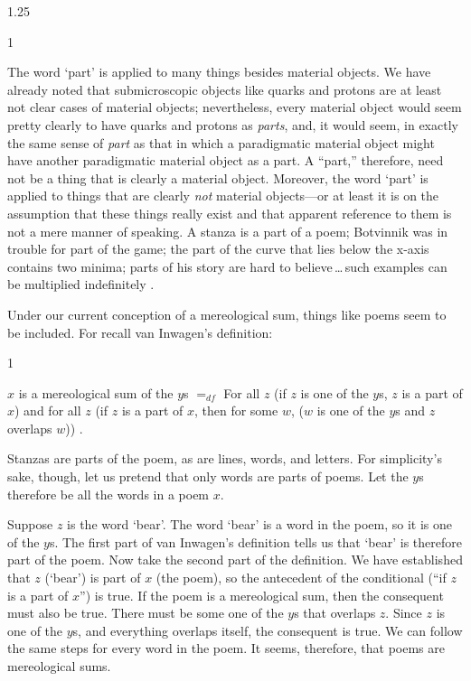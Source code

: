 \documentclass[12pt,twoside]{reedfancy}
\newenvironment{squote}{%
	\begin{spacing}{1}
	\begin{list}{}{%
	\setlength{\labelwidth}{0pt}%
	\rightmargin\leftmargin%
	}
	\item\relax
	}{%
	\end{list}%
	\end{spacing}
	}
\begin{document}
\begin{spacing}{1.25}
\begin{squote}
The word `part' is applied to many things besides material objects.
We have already noted that submicroscopic objects like quarks and
protons are at least not clear cases of material objects;
nevertheless, every material object would seem pretty clearly to have
quarks and protons as \emph{parts}, and, it would seem, in exactly the
same sense of \emph{part} as that in which a paradigmatic material
object might have another paradigmatic material object as a part.  A
``part,'' therefore, need not be a thing that is clearly a material
object.  Moreover, the word `part' is applied to things that are
clearly \emph{not} material objects---or at least it is on the
assumption that these things really exist and that apparent reference
to them is not a mere manner of speaking.  A stanza is a part of a
poem; Botvinnik was in trouble for part of the game; the part of the
curve that lies below the x-axis contains two minima; parts of his
story are hard to believe\,\ldots\,such examples can be multiplied
indefinitely \citeyearpar[18--19]{inwagen1995}.
\end{squote}

Under our current conception of a mereological sum, things like poems
seem to be included.  For recall van Inwagen's definition:

\begin{squote}
$x$ is a mereological sum of the $y$s $=_{df}$ For all $z$ (if $z$ is
  one of the $y$s, $z$ is a part of $x$) and for all $z$ (if $z$ is a
  part of $x$, then for some $w$, ($w$ is one of the $y$s and $z$
  overlaps $w$)) \citeyearpar[618--619]{inwagen2006}.
\end{squote}

Stanzas are parts of the poem, as are lines, words, and letters.  For
simplicity's sake, though, let us pretend that only words are parts of
poems.  Let the $y$s therefore be all the words in a poem $x$.

Suppose $z$ is the word `bear'.  The word `bear' is a word in the
poem, so it is one of the $y$s.  The first part of van Inwagen's
definition tells us that `bear' is therefore part of the poem.  Now
take the second part of the definition.  We have established that $z$
(`bear') is part of $x$ (the poem), so the antecedent of the
conditional (``if $z$ is a part of $x$'') is true.  If the poem is a
mereological sum, then the consequent must also be true.  There must
be some one of the $y$s that overlaps $z$.  Since $z$ is one of the
$y$s, and everything overlaps itself, the consequent is true.  We can
follow the same steps for every word in the poem.  It seems,
therefore, that poems are mereological sums.


\end{spacing}
\end{document}
